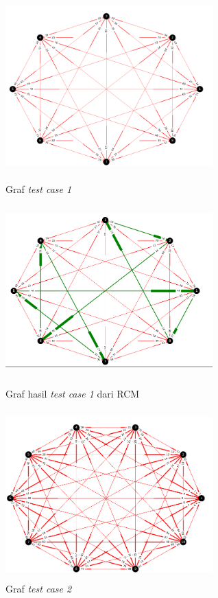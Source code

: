 \documentclass{article}
\begin{document}
	\begin{figure}[htbp]
 	\centering
	\includegraphics[width=8cm, height=6.5cm]{tc1_i.png}
	\caption{Graf \textit{test case 1}}
	\includegraphics[width=8cm, height=6.5cm]{tc1.png}
	\caption{Graf hasil \textit{test case 1} dari RCM}
	\includegraphics[width=8cm, height=6.5cm]{tc2_i.png}
	\caption{Graf \textit{test case 2}}
	\end{figure}
	
\end{document}
